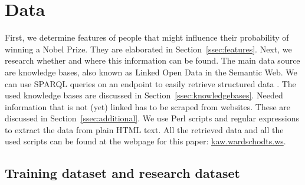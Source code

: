 \section{Data}
\label{sec:data}

First, we determine features of people that might influence their probability of winning a Nobel Prize. They are elaborated in Section~\ref{ssec:features}. Next, we research whether and where this information can be found. The main data source are knowledge bases, also known as Linked Open Data in the Semantic Web. We can use SPARQL queries on an endpoint to easily retrieve structured data \cite{wc3SPARQL}. The used knowledge bases are discussed in Section~\ref{ssec:knowledgebases}. Needed information that is not (yet) linked has to be scraped from websites. These are discussed in Section~\ref{ssec:additional}. We use Perl scripts and regular expressions to extract the data from plain HTML text. All the retrieved data and all the used scripts can be found at the webpage for this paper: \url{kaw.wardschodts.ws}.

\subsection{Training dataset and research dataset}

